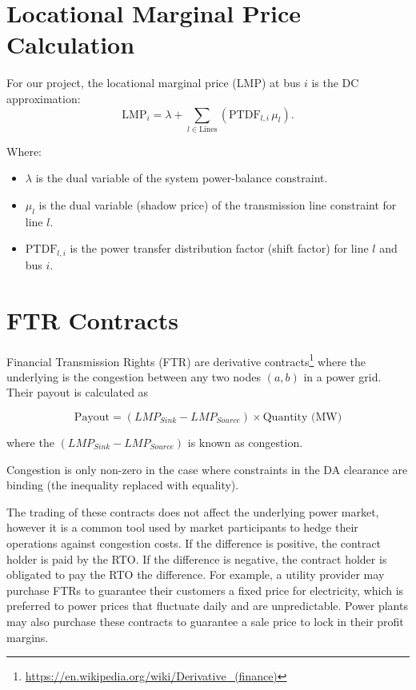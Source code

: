 \documentclass[11pt]{article}
\begin{document}
\section{Locational Marginal Price Calculation}

For our project, the locational marginal price (LMP) at bus $i$ is the DC approximation:
\[
  \mathrm{LMP}_i = \lambda + \sum_{l\in\text{Lines}} \left(\mathrm{PTDF}_{l,i}\,\mu_l\right).
\]

\noindent
Where:
\begin{itemize}
  \item $\lambda$ is the dual variable of the system power-balance constraint.
  \item $\mu_l$ is the dual variable (shadow price) of the transmission line constraint for line $l$.
  \item $\mathrm{PTDF}_{l,i}$ is the power transfer distribution factor (shift factor) for line $l$ and bus $i$.
\end{itemize}

\section{FTR Contracts}
Financial Transmission Rights (FTR) are derivative contracts\footnote{\url{https://en.wikipedia.org/wiki/Derivative_(finance)}} where the underlying is the congestion between any two nodes $(a, b)$ in a power grid. Their payout is calculated as

$$\text{Payout} = (LMP_{Sink} - LMP_{Source}) \times \text{Quantity (MW)}$$

where the $(LMP_{Sink} - LMP_{Source})$ is known as congestion.

Congestion is only non-zero in the case where constraints in the DA clearance are binding (the inequality replaced with equality).

The trading of these contracts does not affect the underlying power market, however it is a common tool used by market participants to hedge their operations against congestion costs. If the difference is positive, the contract holder is paid by the RTO. If the difference is negative, the contract holder is obligated to pay the RTO the difference. For example, a utility provider may purchase FTRs to guarantee their customers a fixed price for electricity, which is preferred to power prices that fluctuate daily and are unpredictable. Power plants may also purchase these contracts to guarantee a sale price to lock in their profit margins.
\end{document}
